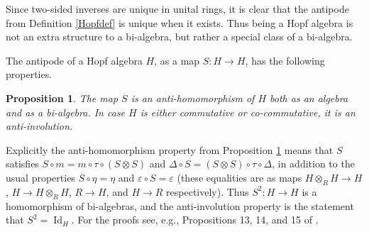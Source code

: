 \documentclass{article}
\newtheorem{prop}[thm]{Proposition}
\theoremstyle{definition}
\begin{document}
Since two-sided inverses are unique in unital rings, it is clear that the antipode from Definition \ref{Hopfdef} is unique when it exists. Thus being a Hopf algebra is not an extra structure to a bi-algebra, but rather a special class of a bi-algebra.

The antipode of a Hopf algebra $H$, as a map $S:H \to H$, has the following properties.
\begin{prop}
The map $S$ is an anti-homomorphism of $H$ both as an algebra and as a bi-algebra. In case $H$ is either commutative or co-commutative, it is an anti-involution. \label{Sprop}
\end{prop}
Explicitly the anti-homomorphism property from Proposition \ref{Sprop} means that $S$ satisfies $S \circ m=m\circ\tau\circ(S \otimes S)$ and $\Delta \circ S=(S \otimes S)\circ\tau\circ\Delta$, in addition to the usual properties $S\circ\eta=\eta$ and $\varepsilon \circ S=\varepsilon$ (these equalities are as maps $H\otimes_{R}H \to H$, $H \to H\otimes_{R}H$, $R \to H$, and $H \to R$ respectively). Thus $S^{2}:H \to H$ is a homomorphism of bi-algebras, and the anti-involution property is the statement that $S^{2}=\operatorname{Id}_{H}$. For the proofs see, e.g., Propositions 13, 14, and 15 of \cite{[D]}.

\medskip
\end{document}
